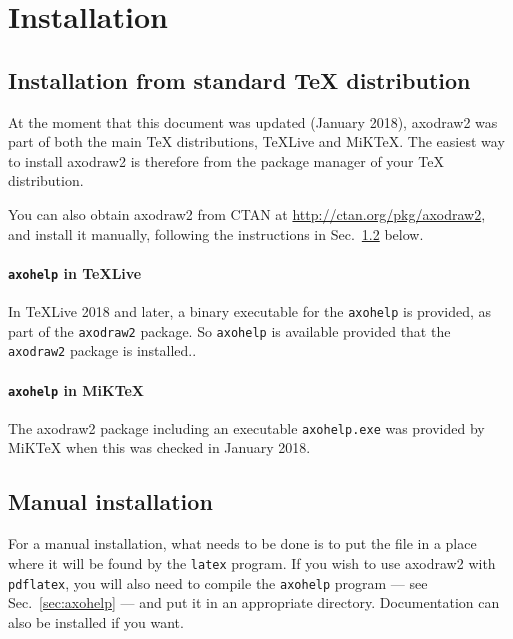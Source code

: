 \documentclass[12pt]{article}
\def\program#1{\texttt{#1}}
\begin{document}
\section{Installation}
\label{sec:installation}

\subsection{Installation from standard \TeX{} distribution}

At the moment that this document was updated (January 2018), axodraw2
was part of both the main \TeX{} distributions, TeXLive and MiKTeX.
The easiest way to install axodraw2 is therefore from the package
manager of your \TeX{} distribution.

You can also obtain axodraw2 from CTAN at
\url{http://ctan.org/pkg/axodraw2}, and install it manually, following
the instructions in Sec.\ \ref{sec:manual.install} below.

\paragraph{\program{axohelp} in TeXLive}
In TeXLive 2018 and later, a binary executable for the
\program{axohelp} is provided, as part of the \program{axodraw2}
package.  So \program{axohelp} is available provided that the
\program{axodraw2} package is installed..


\paragraph{\program{axohelp} in MiKTeX}
The axodraw2 package including an executable \program{axohelp.exe} was
provided by MiKTeX when this was checked in January 2018.



\subsection{Manual installation}
\label{sec:manual.install}

For a manual installation, what needs to be done is to put the file
 in a place where it will be found by the
\program{latex} program.  If you wish to use axodraw2 with
\program{pdflatex}, you will also need to compile the
\program{axohelp} program --- see Sec.\ \ref{sec:axohelp} --- and put
it in an appropriate directory.  Documentation can also be installed
if you want.
\end{document}
